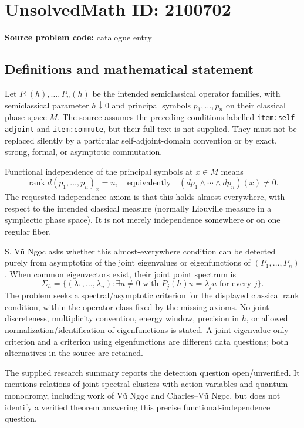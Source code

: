 \documentclass[11pt]{article}
\begin{document}
\section*{UnsolvedMath ID: 2100702}
\textbf{Source problem code:} catalogue entry
\subsection{Definitions and mathematical statement}
Let $P_1(h),\ldots,P_n(h)$ be the intended semiclassical operator families, with semiclassical parameter $h\downarrow0$ and principal symbols $p_1,\ldots,p_n$ on their classical phase space $M$. The source assumes the preceding conditions labelled \texttt{item:self-adjoint} and \texttt{item:commute}, but their full text is not supplied. They must not be replaced silently by a particular self-adjoint-domain convention or by exact, strong, formal, or asymptotic commutation.

Functional independence of the principal symbols at $x\in M$ means
\[
\operatorname{rank}d(p_1,\ldots,p_n)_x=n,
\quad\text{equivalently}\quad
(dp_1\wedge\cdots\wedge dp_n)(x)\ne0.
\]
The requested independence axiom is that this holds almost everywhere, with respect to the intended classical measure (normally Liouville measure in a symplectic phase space). It is not merely independence somewhere or on one regular fiber.

S. V\~u Ng\d{o}c asks whether this almost-everywhere condition can be detected purely from asymptotics of the joint eigenvalues or eigenfunctions of $(P_1,\ldots,P_n)$. When common eigenvectors exist, their joint point spectrum is
\[
\Sigma_h=\{(\lambda_1,\ldots,\lambda_n):
\exists u\ne0\text{ with }P_j(h)u=\lambda_j u\text{ for every }j\}.
\]
The problem seeks a spectral/asymptotic criterion for the displayed classical rank condition, within the operator class fixed by the missing axioms. No joint discreteness, multiplicity convention, energy window, precision in $h$, or allowed normalization/identification of eigenfunctions is stated. A joint-eigenvalue-only criterion and a criterion using eigenfunctions are different data questions; both alternatives in the source are retained.

The supplied research summary reports the detection question open/unverified. It mentions relations of joint spectral clusters with action variables and quantum monodromy, including work of V\~u Ng\d{o}c and Charles--V\~u Ng\d{o}c, but does not identify a verified theorem answering this precise functional-independence question.
\end{document}
